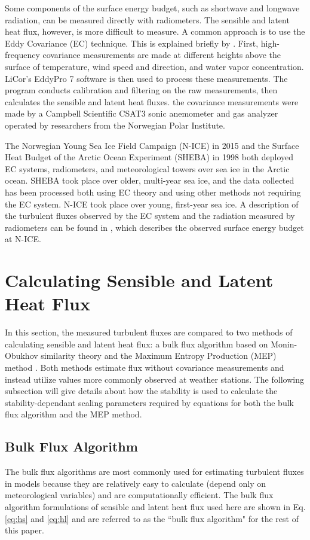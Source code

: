 Some components of the surface energy budget, such as shortwave and longwave radiation, can be measured directly with radiometers. The sensible and latent heat flux, however, is more difficult to measure. A common approach is to use the Eddy Covariance (EC) technique. This is explained briefly by \citet{walden:2017}. First, high-frequency covariance measurements are made at different heights above the surface of temperature, wind speed and direction, and water vapor concentration. LiCor's EddyPro 7 \citep{epro} software is then used to process these measurements. The program conducts calibration and filtering on the raw measurements, then calculates the sensible and latent heat fluxes. the covariance measurements were made by a Campbell Scientific CSAT3 sonic anemometer and gas analyzer operated by researchers from the Norwegian Polar Institute. 

The Norwegian Young Sea Ice Field Campaign (N-ICE) in 2015 and the Surface Heat Budget of the Arctic Ocean Experiment (SHEBA) in 1998 both deployed EC systems, radiometers, and meteorological towers over sea ice in the Arctic ocean. SHEBA took place over older, multi-year sea ice, and the data collected has been processed both using EC theory and using other methods not requiring the EC system. N-ICE took place over young, first-year sea ice. A description of the turbulent fluxes observed by the EC system and the radiation measured by radiometers can be found in \citet{walden:2017}, which describes the observed surface energy budget at N-ICE. 

\section{Calculating Sensible and Latent Heat Flux}
In this section, the measured turbulent fluxes are compared to two methods of calculating sensible and latent heat flux: a bulk flux algorithm based on Monin-Obukhov similarity theory \citep{foken:2008} and the Maximum Entropy Production (MEP) method \citep{zhang:2021, wang:2014, wang:2009}. Both methods estimate flux without covariance measurements and instead utilize values more commonly observed at weather stations. The following subsection will give details about how the stability is used to calculate the stability-dependant scaling parameters required by equations for both the bulk flux algorithm and the MEP method.  

\subsection{Bulk Flux Algorithm}
The bulk flux algorithms are most commonly used for estimating turbulent fluxes \cite{reeves:2021} in models because they are relatively easy to calculate (depend only on meteorological variables) and are computationally efficient. The bulk flux algorithm formulations of sensible and latent heat flux used here are shown in Eq. \ref{eq:hs} and \ref{eq:hl} and are referred to as the ``bulk flux algorithm" for the rest of this paper.


